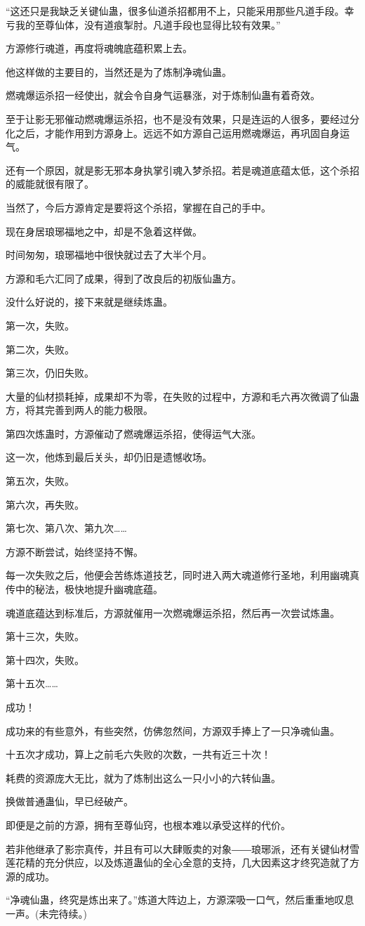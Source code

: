 \begin{this_body}
“这还只是我缺乏关键仙蛊，很多仙道杀招都用不上，只能采用那些凡道手段。幸亏我的至尊仙体，没有道痕掣肘。凡道手段也显得比较有效果。”

方源修行魂道，再度将魂魄底蕴积累上去。

他这样做的主要目的，当然还是为了炼制净魂仙蛊。

燃魂爆运杀招一经使出，就会令自身气运暴涨，对于炼制仙蛊有着奇效。

至于让影无邪催动燃魂爆运杀招，也不是没有效果，只是连运的人很多，要经过分化之后，才能作用到方源身上。远远不如方源自己运用燃魂爆运，再巩固自身运气。

还有一个原因，就是影无邪本身执掌引魂入梦杀招。若是魂道底蕴太低，这个杀招的威能就很有限了。

当然了，今后方源肯定是要将这个杀招，掌握在自己的手中。

现在身居琅琊福地之中，却是不急着这样做。

时间匆匆，琅琊福地中很快就过去了大半个月。

方源和毛六汇同了成果，得到了改良后的初版仙蛊方。

没什么好说的，接下来就是继续炼蛊。

第一次，失败。

第二次，失败。

第三次，仍旧失败。

大量的仙材损耗掉，成果却不为零，在失败的过程中，方源和毛六再次微调了仙蛊方，将其完善到两人的能力极限。

第四次炼蛊时，方源催动了燃魂爆运杀招，使得运气大涨。

这一次，他炼到最后关头，却仍旧是遗憾收场。

第五次，失败。

第六次，再失败。

第七次、第八次、第九次……

方源不断尝试，始终坚持不懈。

每一次失败之后，他便会苦练炼道技艺，同时进入两大魂道修行圣地，利用幽魂真传中的秘法，极快地提升幽魂底蕴。

魂道底蕴达到标准后，方源就催用一次燃魂爆运杀招，然后再一次尝试炼蛊。

第十三次，失败。

第十四次，失败。

第十五次……

成功！

成功来的有些意外，有些突然，仿佛忽然间，方源双手捧上了一只净魂仙蛊。

十五次才成功，算上之前毛六失败的次数，一共有近三十次！

耗费的资源庞大无比，就为了炼制出这么一只小小的六转仙蛊。

换做普通蛊仙，早已经破产。

即便是之前的方源，拥有至尊仙窍，也根本难以承受这样的代价。

若非他继承了影宗真传，并且有可以大肆贩卖的对象――琅琊派，还有关键仙材雪莲花精的充分供应，以及炼道蛊仙的全心全意的支持，几大因素这才终究造就了方源的成功。

“净魂仙蛊，终究是炼出来了。”炼道大阵边上，方源深吸一口气，然后重重地叹息一声。(未完待续。)

\end{this_body}

